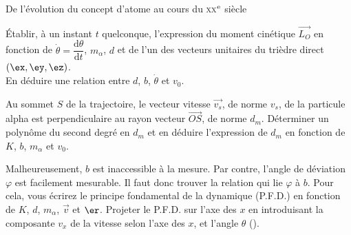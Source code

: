 \begin{exo}[PC][1][devoir]{De l'évolution du concept d'atome au cours du \textsc{xx}$^{\rm e}$ siècle}
\begin{quest}
{
}
\item  Établir, à un instant $t$ quelconque, l'expression du moment cinétique
$\Vec{L_{O}}$ en fonction de $\dot{\theta}=\dfrac{\mathrm{d}\theta}{\mathrm{d}t}$,
$m_{\alpha}$, $d$ et de l'un des vecteurs unitaires du trièdre direct
$(\ex,\ey,\ez)$.\\
En déduire une relation entre $d$, $b$, $\dot{\theta}$ et $v_{0}$.



\item  Au sommet $S$ de la trajectoire, le vecteur vitesse $\Vec{v_{s}}$,
de norme $v_{s}$, de la particule alpha est perpendiculaire au rayon
vecteur $\Vec{OS}$, de norme $d_{m}$. Déterminer un polynôme
du second degré en $d_{m}$ et en déduire l'expression de $d_{m}$
en fonction de $K$, $b$, $m_{\alpha}$ et $v_{0}$.

\item  Malheureusement, $b$ est inaccessible à la mesure. Par contre,
l'angle de déviation $\varphi$ est facilement mesurable. Il faut
donc trouver la relation qui lie $\varphi$ à $b$. Pour cela, vous
écrirez le principe fondamental de la dynamique (P.F.D.) en fonction
de $K$, $d$, $m_{\alpha}$, $\Vec{v}$ et $\er$. Projeter
le P.F.D. sur l'axe des $x$ en introduisant la composante $v_{x}$
de la vitesse selon l'axe des $x$, et l'angle $\theta$ ().



\end{quest}
\end{exo}
